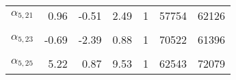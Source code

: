 \begin{longtable}[t]{lrrrrrr}
$\alpha_{5, 21}$ & 0.96 & -0.51 & 2.49 & 1 & 57754 & 62126\\
\cellcolor{gray!6}{$\alpha_{5, 22}$} & \cellcolor{gray!6}{2.70} & \cellcolor{gray!6}{0.77} & \cellcolor{gray!6}{5.23} & \cellcolor{gray!6}{1} & \cellcolor{gray!6}{57949} & \cellcolor{gray!6}{50879}\\
$\alpha_{5, 23}$ & -0.69 & -2.39 & 0.88 & 1 & 70522 & 61396\\
\cellcolor{gray!6}{$\alpha_{5, 24}$} & \cellcolor{gray!6}{0.50} & \cellcolor{gray!6}{-1.14} & \cellcolor{gray!6}{2.25} & \cellcolor{gray!6}{1} & \cellcolor{gray!6}{63484} & \cellcolor{gray!6}{61465}\\
$\alpha_{5, 25}$ & 5.22 & 0.87 & 9.53 & 1 & 62543 & 72079\\*
\end{longtable}